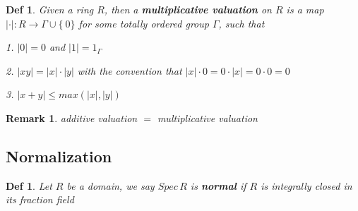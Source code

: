 \documentclass{article}
\newtheorem{definition}[theorem]{Def}
\newtheorem{remark}[theorem]{Remark}
\begin{document}
\begin{definition}
Given a ring $R$, then a \textbf{multiplicative valuation} on $R$ is a map $|\cdot| : R \to \Gamma \cup \{\ 0 \}$ for some totally
ordered group $\Gamma$, such that

1. $|0| = 0$ and $|1| = 1_\Gamma$

2. $|xy| = |x|\cdot |y|$ with the convention that $|x|\cdot0 = 0\cdot|x| = 0 \cdot 0 = 0$

3. $|x + y| \leq max(|x|, |y|)$
\end{definition}

\begin{remark}
    additive valuation $=$ multiplicative valuation
\end{remark}






\newpage
\subsection{Normalization}

\begin{definition}
    Let $R$ be a domain, we say $Spec\,R$ is \textbf{normal} if $R$ is integrally closed in its fraction field 
\end{definition}














\end{document}
